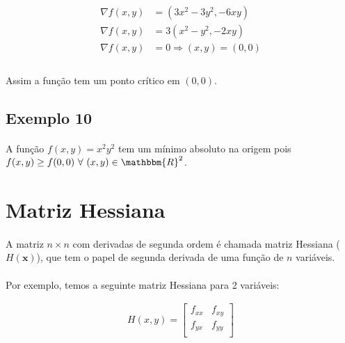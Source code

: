 \documentclass{article}
\begin{document}
            \begin{align*}
                \nabla f(x, y) &= (3x^2 - 3y^2, -6xy)\\
                \nabla f(x, y) &= 3 (x^2 - y^2, -2xy)\\
                \nabla f(x, y) &= 0 \Rightarrow (x, y) = (0,0)\\
            \end{align*}

            \paragraph{}
            Assim a função tem um ponto crítico em $(0,0)$.

        \subsection{Exemplo 10}
            \paragraph{}
            A função $f(x, y) = x^2y^2$ tem um mínimo absoluto na origem pois $f(x, y) \geq f(0,0) \text{ }\forall\text{ } (x, y) \in \mathbbm{R}^2$.
    
    \section{Matriz Hessiana}
        \paragraph{}
        A matriz $n \times n$ com derivadas de segunda ordem é chamada matriz Hessiana ($H(\textbf{x})$), que tem o papel
        de segunda derivada de uma função de $n$ variáveis.
        \paragraph{}
        Por exemplo, temos a seguinte matriz Hessiana para 2 variáveis:

        \begin{align*}
            H(x, y) = 
            \left[
                \begin{matrix}
                    f_{xx}&f_{xy}\\
                    f_{yx}&f_{yy}\\
                \end{matrix}
            \right]
        \end{align*}
\end{document}
